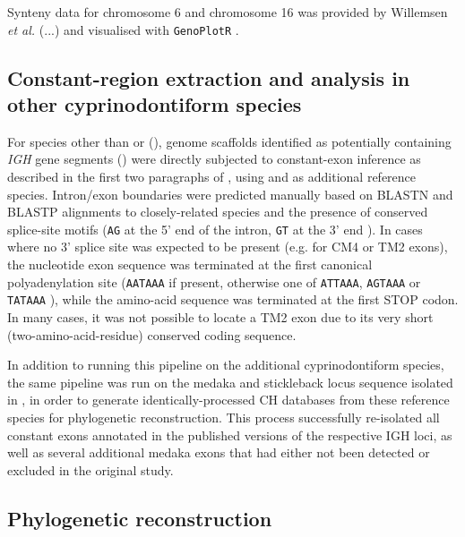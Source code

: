 Synteny data for \Nfu chromosome 6 and \Xma chromosome 16 was provided by Willemsen \textit{et al.} (...) and visualised with \lstinline{GenoPlotR} \parencite{guy2010genoplotr}.

\subsection{Constant-region extraction and analysis in other cyprinodontiform species}
\label{sec:ch_char_crossspecies}

For species other than \Nfu or \Xma (), genome scaffolds identified as potentially containing \textit{IGH} gene segments () were directly subjected to constant-exon inference as described in the first two paragraphs of , using \Nfu and \Xma as additional reference species. Intron/exon boundaries were predicted manually based on BLASTN and BLASTP alignments to closely-related species and the presence of conserved splice-site motifs (\texttt{AG} at the 5' end of the intron, \texttt{GT} at the 3' end \parencite{shapiro1987splice}). In cases where no 3' splice site was expected to be present (e.g. for CM4 or TM2 exons), the nucleotide exon sequence was terminated at the first canonical polyadenylation site (\texttt{AATAAA} if present, otherwise one of \texttt{ATTAAA}, \texttt{AGTAAA} or \texttt{TATAAA} \parencite{ulitsky2012polya}), while the amino-acid sequence was terminated at the first STOP codon. In many cases, it was not possible to locate a TM2 exon due to its very short (two-amino-acid-residue) conserved coding sequence. %

In addition to running this pipeline on the additional cyprinodontiform species, the same pipeline was run on the medaka and stickleback locus sequence isolated in , in order to generate identically-processed CH databases from these reference species for phylogenetic reconstruction. This process successfully re-isolated all constant exons annotated in the published versions of the respective IGH loci, as well as several additional medaka exons that had either not been detected or excluded in the original study.

\subsection{Phylogenetic reconstruction}
\label{sec:phylo_methods}

